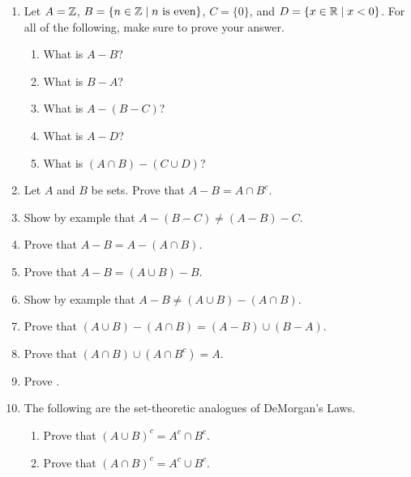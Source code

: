 \probsec{~\ref{sec:compl-set-diff}}
\begin{enumerate}
    \item Let $A = \mathbb{Z}$, $B = \{n \in \mathbb{Z} \mid n \text{ is even}\}$, $C = \{0\}$, and $D = \{x \in \mathbb{R} \mid x <0\}$. For all of the following, make sure to prove your answer.
  \begin{enumerate}
      \item What is $A - B$?
      \item What is $B - A$?
      \item What is $A - (B - C)$?
      \item What is $A - D$?
      \item What is $(A \cap B) - (C \cup D)$?
  \end{enumerate}

    \item Let $A$ and $B$ be sets. Prove that $A - B = A \cap B^c$.

    \item Show by example that $A - (B - C) \neq (A - B) - C$.

    \item Prove that $A - B = A - (A \cap B)$.

    \item Prove that $A - B = (A \cup B) - B$.

    \item Show by example that $A - B \neq (A \cup B) - (A \cap B)$.

    \item Prove that $(A \cup B) - (A \cap B) = (A - B) \cup (B - A)$.

    \item Prove that $(A \cap B) \cup (A \cap B^c) = A$.

    \item Prove .

    \item The following are the set-theoretic analogues of DeMorgan's Laws.
  \begin{enumerate}
      \item Prove that $(A \cup B)^c = A^c \cap B^c$.
      \item Prove that $(A \cap B)^c = A^c \cup B^c$.
  \end{enumerate}

\end{enumerate}
